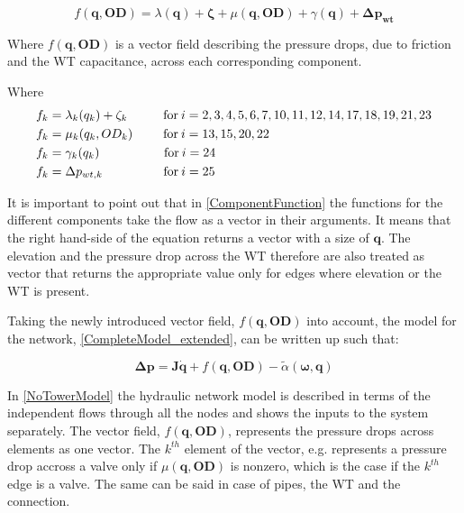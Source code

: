 \begin{equation}
  f(\bm{q}, \bm{OD}) = \lambda(\bm{q}) + \bm{\zeta} + \mu(\bm{q}, \bm{OD}) + \gamma (\bm{q}) + \bm{\Delta p_{wt}}
  \label{ComponentFunction}
\end{equation}

Where $f(\bm{q}, \bm{OD}) $ is a vector field describing the pressure drops, due to friction and the WT capacitance, across each corresponding component. 


Where
\begin{align}
f_k &= \lambda_k (q_k) + \zeta_k  \hskip 1cm  \text{for}\: i = 2,3,4,5,6,7,10,11,12,14,17,18,19,21,23 \\
f_k &= \mu_k (q_k, OD_{k})  \hspace{0.85cm} \text{for}\:i = 13,15,20,22\\
f_k &= \gamma_k (q_k)  \hspace{1.8cm} \text{for}\: i = 24 \\
f_k &= \Delta p_{wt,k}  \hspace{1.7cm} \text{for}\:i = 25
\end{align}

It is important to point out that in \eqref{ComponentFunction} the functions for the different components take the flow as a vector in their arguments. It means that the right hand-side of the equation returns a vector with a size of $\bm{q}$. The elevation and the pressure drop across the WT therefore are also treated as vector that returns the appropriate value only for edges where elevation or the WT is present. 

Taking the newly introduced vector field, $f(\bm{q}, \bm{OD})$ into account, the model for the network, \eqref{CompleteModel_extended}, can be written up such that:

\begin{equation}
  \bm{\Delta p} =  \bm{J} \bm{\dot{q}} + f(\bm{q}, \bm{OD}) - \tilde{\alpha} (\bm{\omega},\bm{q})
  \label{NoTowerModel}
\end{equation}

In \eqref{NoTowerModel} the hydraulic network model is described in terms of the independent flows through all the nodes and shows the inputs to the system separately. The vector field, $f(\bm{q}, \bm{OD})$, represents the pressure drops across elements as one vector. The $k^{th}$ element of the vector, e.g. represents a pressure drop accross a valve only if $\mu(\bm{q},\bm{OD})$ is nonzero, which is the case if the $k^{th}$ edge is a valve. The same can be said in case of pipes, the WT and the connection. 

